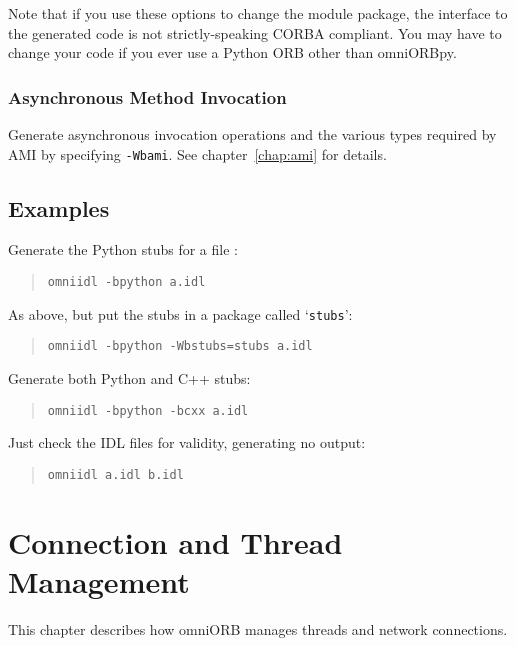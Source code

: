 \documentclass[11pt,oneside,a4paper]{book}
\newcommand{\module}[1]{\texttt{#1}}
\newcommand{\cmdline}[1]{\texttt{#1}}
\begin{document}
Note that if you use these options to change the module package, the
interface to the generated code is not strictly-speaking CORBA
compliant. You may have to change your code if you ever use a Python
ORB other than omniORBpy.


\subsection{Asynchronous Method Invocation}

Generate asynchronous invocation operations and the various types
required by AMI by specifying \cmdline{-Wbami}. See
chapter~\ref{chap:ami} for details.


\section{Examples}

Generate the Python stubs for a file :

\begin{quote}
\cmdline{omniidl -bpython a.idl}
\end{quote}

\noindent As above, but put the stubs in a package called
`\module{stubs}':

\begin{quote}
\cmdline{omniidl -bpython -Wbstubs=stubs a.idl}
\end{quote}

\noindent Generate both Python and C++ stubs:

\begin{quote}
\cmdline{omniidl -bpython -bcxx a.idl}
\end{quote}

\noindent Just check the IDL files for validity, generating no output:

\begin{quote}
\cmdline{omniidl a.idl b.idl}
\end{quote}



\chapter{Connection and Thread Management}
\label{chap:connections}


This chapter describes how omniORB manages threads and network
connections.
\end{document}
